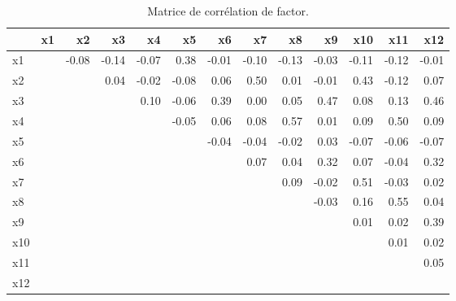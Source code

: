 \documentclass[
  11pt,
  letterpaper,
]{book}
\theoremstyle{definition}
\theoremstyle{remark}
\begin{document}
\hypertarget{tbl-corrmat}{}
\begin{table}
\caption{\label{tbl-corrmat}Matrice de corrélation de factor. }\tabularnewline

\centering
\begin{tabular}{lrrrrrrrrrrrr}
\toprule
  & x1 & x2 & x3 & x4 & x5 & x6 & x7 & x8 & x9 & x10 & x11 & x12\\
\midrule
x1 &  & -0.08 & -0.14 & -0.07 & 0.38 & -0.01 & -0.10 & -0.13 & -0.03 & -0.11 & -0.12 & -0.01\\
x2 &  &  & 0.04 & -0.02 & -0.08 & 0.06 & 0.50 & 0.01 & -0.01 & 0.43 & -0.12 & 0.07\\
x3 &  &  &  & 0.10 & -0.06 & 0.39 & 0.00 & 0.05 & 0.47 & 0.08 & 0.13 & 0.46\\
x4 &  &  &  &  & -0.05 & 0.06 & 0.08 & 0.57 & 0.01 & 0.09 & 0.50 & 0.09\\
x5 &  &  &  &  &  & -0.04 & -0.04 & -0.02 & 0.03 & -0.07 & -0.06 & -0.07\\
\addlinespace
x6 &  &  &  &  &  &  & 0.07 & 0.04 & 0.32 & 0.07 & -0.04 & 0.32\\
x7 &  &  &  &  &  &  &  & 0.09 & -0.02 & 0.51 & -0.03 & 0.02\\
x8 &  &  &  &  &  &  &  &  & -0.03 & 0.16 & 0.55 & 0.04\\
x9 &  &  &  &  &  &  &  &  &  & 0.01 & 0.02 & 0.39\\
x10 &  &  &  &  &  &  &  &  &  &  & 0.01 & 0.02\\
\addlinespace
x11 &  &  &  &  &  &  &  &  &  &  &  & 0.05\\
x12 &  &  &  &  &  &  &  &  &  &  &  & \\
\bottomrule
\end{tabular}
\end{table}
\end{document}
